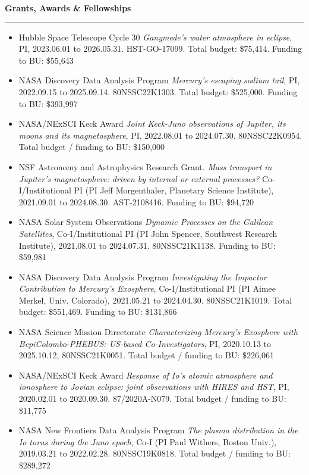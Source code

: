 \documentclass[12pt]{report}
\begin{document}
\noindent\bf{Grants, Awards \& Fellowships}\rm \hspace*{\fill} \\
\rule{\textwidth}{1pt}
\begin{itemize} \itemsep -2pt %
 \item Hubble Space Telescope Cycle 30 {\it Ganymede's water atmosphere in eclipse}, PI, 2023.06.01 to 2026.05.31. HST-GO-17099. Total budget: \$75,414. Funding to BU: \$55,643
 \item NASA Discovery Data Analysis Program {\it Mercury's escaping sodium tail}, PI, 2022.09.15 to 2025.09.14. 80NSSC22K1303. Total budget: \$525,000. Funding to BU: \$393,997
 \item NASA/NExSCI Keck Award {\it Joint Keck-Juno observations of Jupiter, its moons and its magnetosphere}, PI, 2022.08.01 to 2024.07.30. 80NSSC22K0954. Total budget / funding to BU: \$150,000
 \item NSF Astronomy and Astrophysics Research Grant. {\it Mass transport in Jupiter's magnetosphere: driven by internal or external processes?} Co-I/Institutional PI (PI Jeff Morgenthaler, Planetary Science Institute), 2021.09.01 to 2024.08.30. AST-2108416. Funding to BU: \$94,720
 \item NASA Solar System Observations {\it Dynamic Processes on the Galilean Satellites}, Co-I/Institutional PI (PI John Spencer, Southwest Research Institute), 2021.08.01 to 2024.07.31. 80NSSC21K1138. Funding to BU: \$59,981
 \item NASA Discovery Data Analysis Program {\it Investigating the Impactor Contribution to Mercury's Exosphere}, Co-I/Institutional PI (PI Aimee Merkel, Univ. Colorado), 2021.05.21 to 2024.04.30. 80NSSC21K1019. Total budget: \$551,469. Funding to BU: \$131,866
 \item NASA Science Mission Directorate {\it Characterizing Mercury’s Exosphere with BepiColombo-PHEBUS: US-based Co-Investigators}, PI, 2020.10.13 to 2025.10.12, 80NSSC21K0051. Total budget / funding to BU: \$226,061
 \item NASA/NExSCI Keck Award {\it Response of Io's atomic atmosphere and ionosphere to Jovian eclipse: joint observations with HIRES and HST}, PI, 2020.02.01 to 2020.09.30. 87/2020A-N079. Total budget / funding to BU: \$11,775
 \item NASA New Frontiers Data Analysis Program {\it The plasma distribution in the Io torus during the Juno epoch}, Co-I (PI Paul Withers, Boston Univ.), 2019.03.21 to 2022.02.28. 80NSSC19K0818. Total budget / funding to BU: \$289,272

\end{itemize}
\end{document}
